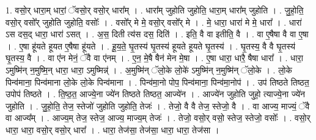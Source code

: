\documentclass[17pt]{extarticle}
\begin{document}
1. वसो॒र् धारा॒म् धारां॒ ॅवसो॒र् वसो॒र् धारा᳚म् । . धारा᳚म् जुहोति जुहोति॒ धारा॒म् धारा᳚म् जुहोति । . जु॒हो॒ति॒ वसो॒र् वसो᳚र् जुहोति जुहोति॒ वसोः᳚ । . वसो᳚र् मे मे॒ वसो॒र् वसो᳚र् मे । . मे॒ धारा॒ धारा॑ मे मे॒ धारा᳚ । . धारा॑ ऽस दस॒द् धारा॒ धारा॑ ऽसत् । . अ॒स॒ दिती त्य॑स दस॒ दिति॑ । . इति॒ वै वा इतीति॒ वै । . वा ए॒षैषा वै वा ए॒षा । . ए॒षा हू॑यते हूयत ए॒षैषा हू॑यते । . हू॒य॒ते॒ घृ॒तस्य॑ घृ॒तस्य॑ हूयते हूयते घृ॒तस्य॑ । . घृ॒तस्य॒ वै वै घृ॒तस्य॑ घृ॒तस्य॒ वै । . वा ए॑न मेनं॒ ॅवै वा ए॑नम् । . ए॒न॒ मे॒षै षैन॑ मेन मे॒षा । . ए॒षा धारा॒ धारै॒ षैषा धारा᳚ । . धारा॒ ऽमुष्मि॑न् न॒मुष्मि॒न् धारा॒ धारा॒ ऽमुष्मिन्न्॑ । . अ॒मुष्मि॑न् ॅलो॒के लो॒के॑ ऽमुष्मि॑न् न॒मुष्मि॑न् ॅलो॒के । . लो॒के पिन्व॑माना॒ पिन्व॑माना लो॒के लो॒के पिन्व॑माना । . पिन्व॑मा॒नो पोप॒ पिन्व॑माना॒ पिन्व॑मा॒नोप॑ । . उप॑ तिष्ठते तिष्ठत॒ उपोप॑ तिष्ठते । . ति॒ष्ठ॒त॒ आज्ये॒ना ज्ये॑न तिष्ठते तिष्ठत॒ आज्ये॑न । . आज्ये॑न जुहोति जुहो॒ त्याज्ये॒ना ज्ये॑न जुहोति । . जु॒हो॒ति॒ तेज॒ स्तेजो॑ जुहोति जुहोति॒ तेजः॑ । . तेजो॒ वै वै तेज॒ स्तेजो॒ वै । . वा आज्य॒ माज्यं॒ ॅवै वा आज्य᳚म् । . आज्य॒म् तेज॒ स्तेज॒ आज्य॒ माज्य॒म् तेजः॑ । . तेजो॒ वसो॒र् वसो॒ स्तेज॒ स्तेजो॒ वसोः᳚ । . वसो॒र् धारा॒ धारा॒ वसो॒र् वसो॒र् धारा᳚ । . धारा॒ तेज॑सा॒ तेज॑सा॒ धारा॒ धारा॒ तेज॑सा । \newline
\end{document}
